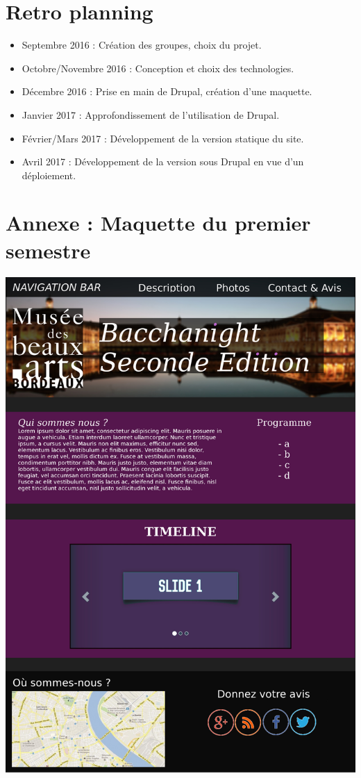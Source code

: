 \documentclass[11pt]{report}
\begin{document}

\section{Retro planning}

\begin{itemize}
	\item Septembre 2016 : Création des groupes, choix du projet.
	\item Octobre/Novembre 2016 : Conception et choix des technologies.
	\item Décembre 2016 : Prise en main de Drupal, création d'une maquette.
	\item Janvier 2017 : Approfondissement de l'utilisation de Drupal.
	\item Février/Mars 2017 : Développement de la version statique du site.
	\item Avril 2017 : Développement de la version sous Drupal en vue d'un déploiement.
\end{itemize}


\newpage

\section{Annexe : Maquette du premier semestre}

\vspace{0.4cm}
\includegraphics[scale=0.75]{maquette.jpg}
\end{document}
